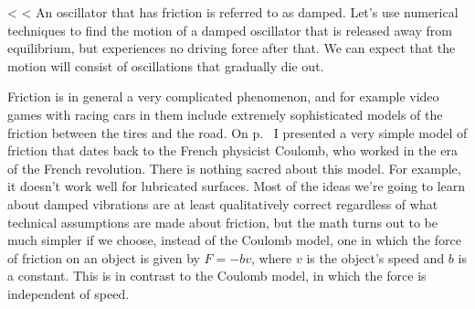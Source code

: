 <%
        <%
        An oscillator that has friction is referred to as
        damped.
        Let's use numerical techniques to find the motion of a damped
        oscillator that is released away from equilibrium, but experiences
        no driving force after that. We can expect that the motion will consist
        of oscillations that gradually die out.

        Friction is in general a very complicated phenomenon, and for example video games with racing cars
        in them include extremely sophisticated models of the friction between the tires and the road.
        On p.~\pageref{subsec:coulomb-friction} I presented a very simple model of friction that dates back
        to the French physicist Coulomb, who worked in the era of the French revolution. There is nothing
        sacred about this model. For example, it doesn't work well for lubricated surfaces.
        Most of the ideas we're going to learn about damped vibrations are at least qualitatively
        correct regardless of what technical assumptions are made about friction, but the math turns out
        to be much simpler if we choose, instead of the Coulomb model, one in which the force of friction
        on an object is given by $F=-bv$, where $v$ is the object's speed and $b$ is a constant.
        This is in contrast to the Coulomb model, in which the force is independent of speed.

